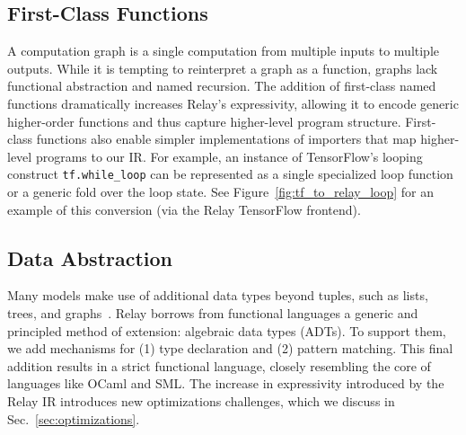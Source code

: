\subsection*{First-Class Functions}

A computation graph is a single computation
  from multiple inputs to multiple outputs.
While it is tempting to reinterpret a graph as a function,
  graphs lack functional abstraction and named recursion.
The addition of first-class named functions dramatically increases
  Relay's expressivity, allowing it to encode generic
  higher-order functions and thus capture higher-level program structure.
First-class functions also enable simpler implementations
  of importers that map higher-level programs to our IR.
For example, an instance of TensorFlow's looping construct \verb|tf.while_loop|
  can be represented as a single specialized loop function
  or a generic fold over the loop state.
See Figure~\ref{fig:tf_to_relay_loop} for an example of this conversion (via
  the Relay TensorFlow frontend).

\subsection*{Data Abstraction}
Many models make use of additional data types beyond
  tuples, such as lists, trees, and graphs~\citep{char-rnn, tree_lstm, graph_lstm}.
Relay borrows from functional languages
  a generic and principled method of extension:
  algebraic data types (ADTs).
To support them, we add mechanisms for
  (1) type declaration and
  (2) pattern matching.
This final addition results in a strict functional language,
  closely resembling the core of languages like OCaml and SML.
The increase in expressivity introduced by the Relay IR introduces
  new optimizations challenges, which we
  discuss in Sec.~\ref{sec:optimizations}.

